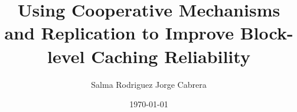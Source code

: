 \documentclass{beamer}
\title[Improving Caching Reliability]{Using Cooperative Mechanisms and Replication to Improve Block-level Caching Reliability}
\author{
	{\rm Salma Rodriguez}
	\qquad
	{\rm Jorge Cabrera}
}
\institute [FIU]{
    Florida International University \\
    {\emph{\{srodr063, jcabr020\}@fiu.edu}}
}
\date{\today}
\begin{document}
%
%
\begin{frame}
    \titlepage
\end{frame}
%
%





%
\end{document}
